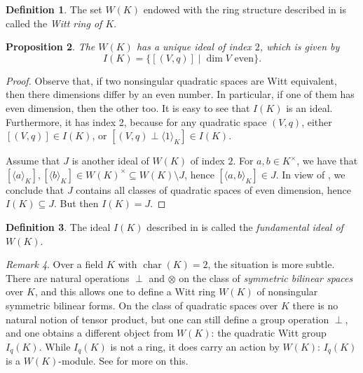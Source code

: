 \documentclass[12pt, leqno, british]{amsart}
\theoremstyle{definition}
\newtheorem{defi}{Definition}[subsection]
\theoremstyle{plain}
\newtheorem{prop}[defi]{Proposition}
\theoremstyle{remark}
\newtheorem{rem}[defi]{Remark}
\DeclareMathOperator{\charac}{char}
\begin{document}
\begin{defi}
The set $W(K)$ endowed with the ring structure described in  is called the \emph{Witt ring of $K$}.
\end{defi}
\begin{prop}\label{P:fundamental-ideal}
The $W(K)$ has a unique ideal of index $2$, which is given by
$$ I(K) = \lbrace [(V, q)] \mid \dim V \text{ even} \rbrace.$$
\end{prop}
\begin{proof}
Observe that, if two nonsingular quadratic spaces are Witt equivalent, then there dimensions differ by an even number.
In particular, if one of them has even dimension, then the other too.
It is easy to see that $I(K)$ is an ideal.
Furthermore, it has index 2, because for any quadratic space $(V, q)$, either $[(V, q)] \in I(K)$, or $[(V, q) \perp \langle 1 \rangle_K] \in I(K)$.

Assume that $J$ is another ideal of $W(K)$ of index $2$.
For $a, b \in K^\times$, we have that $[\langle a \rangle_K], [\langle b \rangle_K] \in W(K)^\times \subseteq W(K) \setminus J$, hence $[\langle a, b \rangle_K] \in J$.
In view of , we conclude that $J$ contains all classes of quadratic spaces of even dimension, hence $I(K) \subseteq J$.
But then $I(K) = J$.
\end{proof}
\begin{defi}
The ideal $I(K)$ described in  is called the \emph{fundamental ideal of $W(K)$}.
\end{defi}

\begin{rem}
Over a field $K$ with $\charac(K) = 2$, the situation is more subtle. There are natural operations $\perp$ and $\otimes$ on the class of \textit{symmetric bilinear spaces} over $K$, and this allows one to define a Witt ring $W(K)$ of nonsingular symmetric bilinear forms.
On the class of quadratic spaces over $K$ there is no natural notion of tensor product, but one can still define a group operation $\perp$, and one obtains a different object from $W(K)$: the quadratic Witt group $I_q(K)$.
While $I_q(K)$ is not a ring, it does carry an action by $W(K)$: $I_q(K)$ is a $W(K)$-module.
See \autocite[Sections 2, 8]{ElmanKarpenkoMerkurjev} for more on this.
\end{rem}
\end{document}
